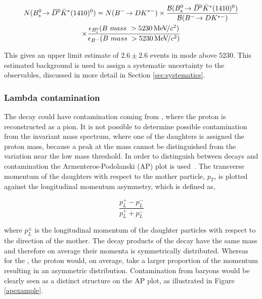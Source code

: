 \begin{multline}
N(\decay{\Bs}{\Dzb\bar{K}^{*}(1410)^0}) = N(\btodkst) \times \frac{\BF(\decay{\Bs}{\Dzb\bar{K}^{*}(1410)^0})}{\BF(\btodkst)} \\ \times \frac{\epsilon_{\Bs}(B\ mass\ > 5230\mevcc)}{\epsilon_{\Bm}(B\ mass\ > 5230\mevcc)}
\label{Bscalc}
\end{multline}

This gives an upper limit estimate of $2.6 \pm 2.6$  events in \pik mode above 5230\mev. This estimated \Bs background is used to assign a systematic uncertainty to the \CP observables, discussed in more detail in Section \ref{sec:systematics}.


\subsubsection{Lambda contamination}
\label{sec:backgrounds:contamination}

The \decay{\KS}{\pip\pim} decay could have contamination coming from \decay{\Lz}{\proton\pim}, where the proton is reconstructed as a pion. It is not possible to determine possible \Lz contamination from the \KS invariant mass spectrum, where one of the \KS daughters is assigned the proton mass, because a peak at the \Lz mass cannot be distinguished from the variation near the low mass threshold. In order to distinguish between \KS decays and \Lz contamination the Armenteros-Podolanski (AP) plot is used~\cite{APplot}. The transverse momentum of the daughters with respect to the mother particle, $p_T$, is plotted against the longitudinal momentum asymmetry, which is defined as,

\begin{equation}
\frac{p_L^+ - p_L^-}{p_L^+ + p_L^-}
\label{longitudinalpasy}
\end{equation}

where $p_L^{\pm}$ is the longitudinal momentum of the daughter particles with respect to the direction of the mother. The decay products of the \decay{\KS}{\pip\pim} decay have the same mass and therefore on average their momenta is symmetrically distributed. Whereas for the \decay{\Lz}{\proton\pim}, the proton would, on average, take a larger proportion of the momentum resulting in an asymmetric distribution. Contamination from \Lz baryons would be clearly seen as a distinct structure on the AP plot, as illustrated in Figure \ref{apexample}. 

